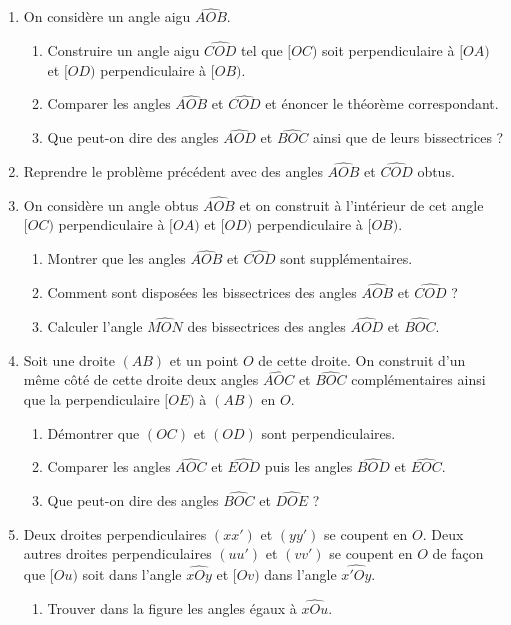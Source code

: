 \begin{enumerate}
\item On considère un angle aigu $\widehat{AOB}$.\begin{enumerate}
\item Construire un angle aigu $\widehat{COD}$ tel que $[OC)$ soit perpendiculaire à $[OA)$ et $[OD)$ perpendiculaire à $[OB)$. 
\item Comparer les angles $\widehat{AOB}$ et $\widehat{COD}$ et énoncer le théorème
correspondant. 
\item Que peut-on dire des angles $\widehat{AOD}$ et $\widehat{BOC}$ ainsi que de 
leurs bissectrices ?
\end{enumerate}
\item Reprendre le problème précédent avec des angles $\widehat{AOB}$ et $\widehat{COD}$ obtus. 
\item On considère un angle obtus $\widehat{AOB}$ et on construit à l'intérieur de cet angle $[OC)$ perpendiculaire à $[OA)$ et $[OD)$ perpendiculaire à $[OB)$. \begin{enumerate}
\item Montrer que les angles $\widehat{AOB}$ et $\widehat{COD}$ sont supplémentaires.
\item Comment sont disposées les bissectrices des angles $\widehat{AOB}$ et $\widehat{COD}$ ? 
\item Calculer l'angle $\widehat{MON}$ des bissectrices des angles $\widehat{AOD}$ et $\widehat{BOC}$. 
\end{enumerate}
\item Soit une droite $(AB)$ et un point $O$ de cette droite. On construit d'un
même côté de cette droite deux angles $\widehat{AOC}$ et $\widehat{BOC}$ complémentaires ainsi que la perpendiculaire $[OE)$ à $(AB)$ en $O$. 
\begin{enumerate}
\item Démontrer que $(OC)$ et $(OD)$ sont perpendiculaires. 
\item Comparer les angles $\widehat{AOC}$ et $\widehat{EOD}$ puis les angles $\widehat{BOD}$ et $\widehat{EOC}$. 
\item Que peut-on dire des angles $\widehat{BOC}$ et $\widehat{DOE}$ ?
\end{enumerate}
\item Deux droites perpendiculaires $(xx')$ et $(yy')$ se coupent en $O$. Deux autres droites perpendiculaires $(uu')$ et $(vv')$ se coupent en $O$ de façon que $[Ou)$ soit dans l'angle $\widehat{xOy}$ et $[Ov)$ dans l'angle $\widehat{x'Oy}$. \begin{enumerate}
\item Trouver dans la figure les angles égaux à $\widehat{xOu}$. 

\end{enumerate}
\end{enumerate}
